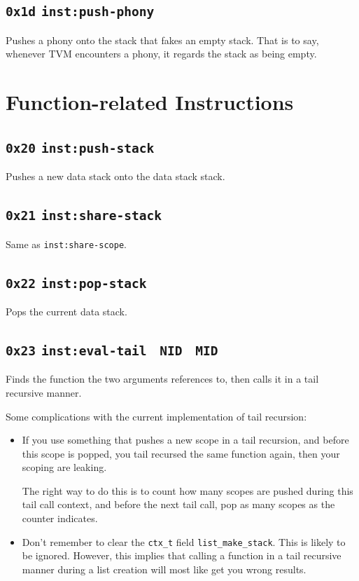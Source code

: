 \documentclass{report}
\newcommand{\mtilde}[1]{\textasciitilde}
\newcommand{\marg}[1]{\texttt{\mtilde ~#1}}
\newcommand{\inst}[1] {\texttt{inst:#1}}
\begin{document}
\subsection{\texttt{0x1d} \inst{push-phony}}

Pushes a phony onto the stack that fakes an empty stack. That is to say, whenever TVM encounters a phony, it regards the stack as being empty.

\section{Function-related Instructions}

\subsection{\texttt{0x20} \inst{push-stack}}

Pushes a new data stack onto the data stack stack.

\subsection{\texttt{0x21} \inst{share-stack}}

Same as \inst{share-scope}.

\subsection{\texttt{0x22} \inst{pop-stack}}

Pops the current data stack.

\subsection{\texttt{0x23} \inst{eval-tail} \marg{NID} \marg{MID}}

Finds the function the two arguments references to, then calls it in a tail recursive manner.

\begin{mdframed}[style=detail]
  Some complications with the current implementation of tail recursion:
  \begin{itemize}
  \item If you use something that pushes a new scope in a tail recursion, and before this scope is popped, you tail recursed the same function again, then your scoping are leaking.

The right way to do this is to count how many scopes are pushed during this tail call context, and before the next tail call, pop as many scopes as the counter indicates.
  \item Don't remember to clear the \texttt{ctx\_t} field \texttt{list\_make\_stack}. This is likely to be ignored. However, this implies that calling a function in a tail recursive manner during a list creation will most like get you wrong results.
  \end{itemize}
\end{mdframed}
\end{document}
